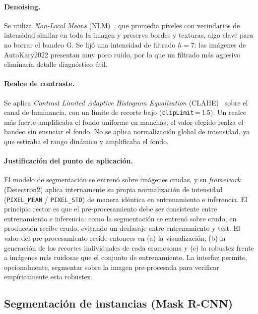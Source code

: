 \documentclass[11pt,a4paper]{article}
\begin{document}
\paragraph{Denoising.} Se utiliza \textit{Non-Local Means}
(NLM)~\cite{buades2005nlm}, que promedia píxeles con vecindarios de intensidad
similar en toda la imagen y preserva bordes y texturas, algo clave para no borrar el
bandeo G. Se fijó una intensidad de filtrado \(h=7\): las imágenes de AutoKary2022
presentan muy poco ruido, por lo que un filtrado más agresivo eliminaría detalle
diagnóstico útil.

\paragraph{Realce de contraste.} Se aplica \textit{Contrast Limited Adaptive
Histogram Equalization} (CLAHE)~\cite{zuiderveld1994clahe} sobre el canal de
luminancia, con un límite de recorte bajo (\texttt{clipLimit}\,=\,1.5). Un realce
más fuerte amplificaba el fondo uniforme en manchas; el valor elegido realza el
bandeo sin ensuciar el fondo. No se aplica normalización global de intensidad, ya
que estiraba el rango dinámico y amplificaba el fondo.

\paragraph{Justificación del punto de aplicación.} El modelo de segmentación se
entrenó sobre imágenes crudas, y su \textit{framework} (Detectron2) aplica
internamente su propia normalización de intensidad (\texttt{PIXEL\_MEAN} /
\texttt{PIXEL\_STD}) de manera idéntica en entrenamiento e inferencia. El principio
rector es que el pre-procesamiento debe ser consistente entre entrenamiento
e inferencia: como la segmentación se entrenó sobre crudo, en producción recibe
crudo, evitando un desfasaje entre entrenamiento y test. El valor del
pre-procesamiento reside entonces en (a) la visualización, (b) la generación de los
recortes individuales de cada cromosoma y (c) la robustez frente a imágenes más
ruidosas que el conjunto de entrenamiento. La interfaz permite, opcionalmente,
segmentar sobre la imagen pre-procesada para verificar empíricamente esta robustez.

\subsection{Segmentación de instancias (Mask R-CNN)}
\label{sec:segmentacion}
\end{document}
